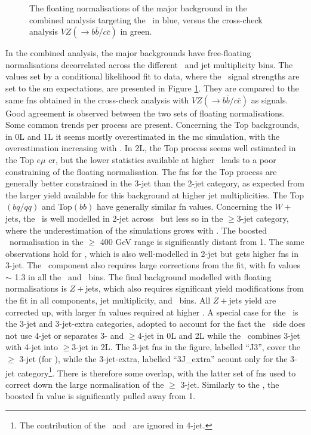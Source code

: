 \begin{figure}[h!]
    \caption{The floating normalisations of the major background in the combined analysis targeting the \vhbc\ in blue, versus the cross-check analysis $VZ(\rightarrow b\bar{b}/c\bar{c})$ in green.}
    \label{fig:FNback}
\end{figure} 

In the combined analysis, the major backgrounds have free-floating normalisations decorrelated across the different \ptv\ and jet multiplicity bins. The values set by a conditional likelihood fit to data, where the \vhbc\ signal strengths are set to the \gls{sm} expectations, are presented in Figure \ref{fig:FNback}. They are compared to the same \glspl{fn} obtained in the cross-check analysis with $VZ(\rightarrow b\bar{b}/c\bar{c})$ as signals. Good agreement is observed between the two sets of floating normalisations. Some common trends per process are present. Concerning the Top backgrounds, in 0L and 1L it seems mostly overestimated in the \gls{mc} simulation, with the overestimation increasing with \ptv. In 2L, the Top process seems well estimated in the Top $e\mu$ \gls{cr}, but the lower statistics available at higher \ptv\ leads to a poor constraining of the floating normalisation. The \glspl{fn} for the Top process are generally better constrained in the 3-jet than the 2-jet category, as expected from the larger yield available for this background at higher jet multiplicities. The Top$(bq/qq)$ and Top$(bb)$ have generally similar \gls{fn} values. Concerning the $W+$jets, the \whf\ is well modelled in 2-jet across \ptv\ but less so in the $\geq$3-jet category, where the underestimation of the simulations grows with \ptv. The boosted \whf\ normalisation in the $\geq$ 400 GeV range is significantly distant from 1. The same observations hold for \wlf, which is also well-modelled in 2-jet but gets higher \glspl{fn} in 3-jet. The \wmf\ component also requires large corrections from the fit, with \gls{fn} values $\sim$ 1.3 in all the \nj\ and \ptv\ bins. The final background modelled with floating normalisations is $Z+$jets, which also requires significant yield modifications from the fit in all components, jet multiplicity, and \ptv\ bins. All $Z+$jets yield are corrected up, with larger \gls{fn} values required at higher \ptv. A special case for the \zhf\ is the 3-jet and 3-jet-extra categories, adopted to account for the fact the \vhc\ side does not use 4-jet or separates 3- and $\geq$4-jet in 0L and 2L while the \vhb\ combines 3-jet with 4-jet into $\geq$3-jet in 2L. The 3-jet \glspl{fn} in the figure, labelled ``J3'', cover the $\geq$ 3-jet (for \vhb), while the 3-jet-extra, labelled ``3J\_extra'' acount only for the 3-jet category\footnote{The contribution of the \zmf\ and \zlf\ are ignored in 4-jet.}. There is therefore some overlap, with the latter set of \glspl{fn} used to correct down the large normalisation of the $\geq$ 3-jet. Similarly to the \whf, the boosted \zhf \gls{fn} value is significantly pulled away from 1.\\

